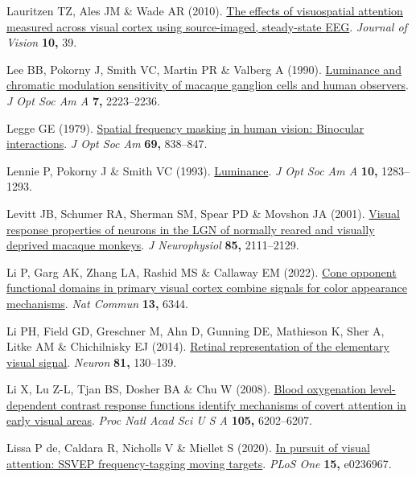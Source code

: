 \documentclass[
  letterpaper,
  DIV=11,
  numbers=noendperiod]{scrartcl}
\newlength{\cslhangindent}
\newenvironment{CSLReferences}[2] %
 {\begin{list}{}{%
  \setlength{\itemindent}{0pt}
  \setlength{\leftmargin}{0pt}
  \setlength{\parsep}{0pt}
  \ifodd #1
   \setlength{\leftmargin}{\cslhangindent}
   \setlength{\itemindent}{-1\cslhangindent}
  \fi
  \setlength{\itemsep}{#2\baselineskip}}}
 {\end{list}}
\begin{document}
\begin{CSLReferences}{1}{1}
Lauritzen TZ, Ales JM \& Wade AR (2010).
\href{https://doi.org/10.1167/10.14.39}{The effects of visuospatial
attention measured across visual cortex using source-imaged,
steady-state {EEG}}. \emph{Journal of Vision} \textbf{10,} 39.

Lee BB, Pokorny J, Smith VC, Martin PR \& Valberg A (1990).
\href{https://doi.org/10.1364/josaa.7.002223}{Luminance and chromatic
modulation sensitivity of macaque ganglion cells and human observers}.
\emph{J Opt Soc Am A} \textbf{7,} 2223--2236.

Legge GE (1979). \href{https://doi.org/10.1364/josa.69.000838}{Spatial
frequency masking in human vision: Binocular interactions}. \emph{J Opt
Soc Am} \textbf{69,} 838--847.

Lennie P, Pokorny J \& Smith VC (1993).
\href{https://doi.org/10.1364/josaa.10.001283}{Luminance}. \emph{J Opt
Soc Am A} \textbf{10,} 1283--1293.

Levitt JB, Schumer RA, Sherman SM, Spear PD \& Movshon JA (2001).
\href{https://doi.org/10.1152/jn.2001.85.5.2111}{Visual response
properties of neurons in the LGN of normally reared and visually
deprived macaque monkeys}. \emph{J Neurophysiol} \textbf{85,}
2111--2129.

Li P, Garg AK, Zhang LA, Rashid MS \& Callaway EM (2022).
\href{https://doi.org/10.1038/s41467-022-34020-2}{Cone opponent
functional domains in primary visual cortex combine signals for color
appearance mechanisms}. \emph{Nat Commun} \textbf{13,} 6344.

Li PH, Field GD, Greschner M, Ahn D, Gunning DE, Mathieson K, Sher A,
Litke AM \& Chichilnisky EJ (2014).
\href{https://doi.org/10.1016/j.neuron.2013.10.043}{Retinal
representation of the elementary visual signal}. \emph{Neuron}
\textbf{81,} 130--139.

Li X, Lu Z-L, Tjan BS, Dosher BA \& Chu W (2008).
\href{https://doi.org/10.1073/pnas.0801390105}{Blood oxygenation
level-dependent contrast response functions identify mechanisms of
covert attention in early visual areas}. \emph{Proc Natl Acad Sci U S A}
\textbf{105,} 6202--6207.

Lissa P de, Caldara R, Nicholls V \& Miellet S (2020).
\href{https://doi.org/10.1371/journal.pone.0236967}{In pursuit of visual
attention: SSVEP frequency-tagging moving targets}. \emph{PLoS One}
\textbf{15,} e0236967.


\end{CSLReferences}
\end{document}
